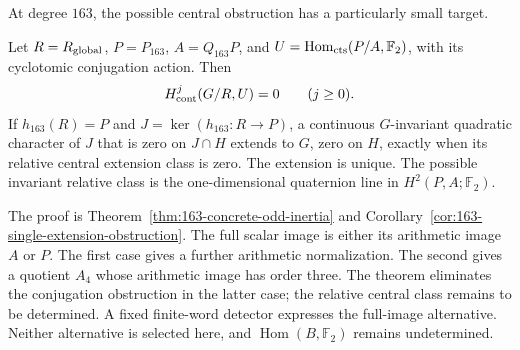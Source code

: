 At degree \(163\), the possible central obstruction has a particularly
small target.

\begin{theorem}\label{thm:main-163-odd-inertia}
Let \(R=R_{\rm global}\), \(P=P_{163}\), \(A=Q_{163}P\), and
\(U=\operatorname{Hom}_{\rm cts}(P/A,\mathbb F_2)\), with its
cyclotomic conjugation action. Then
\[
 H^j_{\rm cont}(G/R,U)=0\qquad(j\ge0).
\]
If \(h_{163}(R)=P\) and \(J=\ker(h_{163}:R\to P)\), a continuous
\(G\)-invariant quadratic character of \(J\) that is zero on
\(J\cap H\) extends to \(G\), zero on \(H\), exactly when its
relative central extension class is zero. The extension is unique.
The possible invariant relative class is the one-dimensional
quaternion line in \(H^2(P,A;\mathbb F_2)\).
\end{theorem}

The proof is Theorem~\ref{thm:163-concrete-odd-inertia} and
Corollary~\ref{cor:163-single-extension-obstruction}.
The full scalar image is either its arithmetic image \(A\) or \(P\).
The first case gives a further arithmetic normalization. The second
gives a quotient \(A_4\) whose arithmetic image has order three.
The theorem eliminates the conjugation obstruction in the latter
case; the relative central class remains to be determined.
A fixed finite-word detector expresses the full-image alternative.
Neither alternative is selected here, and
\(\operatorname{Hom}(B,\mathbb F_2)\) remains undetermined.

